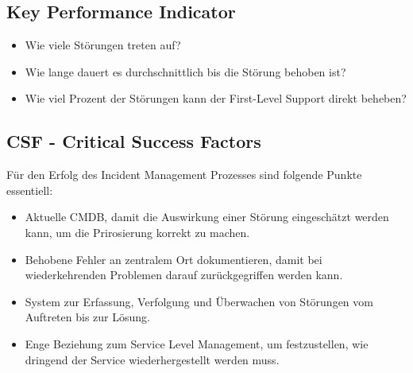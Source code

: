 \subsection{Key Performance Indicator}
\begin{itemize}
	\item Wie viele Störungen treten auf? 
	\item Wie lange dauert es durchschnittlich bis die Störung behoben ist? 
	\item Wie viel Prozent der Störungen kann der First-Level Support direkt beheben?
\end{itemize}

\subsection{CSF - Critical Success Factors}
Für den Erfolg des Incident Management Prozesses sind folgende Punkte essentiell:
\begin{itemize}
	\item Aktuelle CMDB, damit die Auswirkung einer Störung eingeschätzt werden kann, um die Prirosierung korrekt zu machen.
	\item Behobene Fehler an zentralem Ort dokumentieren, damit bei wiederkehrenden Problemen darauf zurückgegriffen werden kann.
	\item System zur Erfassung, Verfolgung und Überwachen von Störungen vom Auftreten bis zur Lösung.
	\item Enge Beziehung zum Service Level Management, um festzustellen, wie dringend der Service wiederhergestellt werden muss.
\end{itemize}